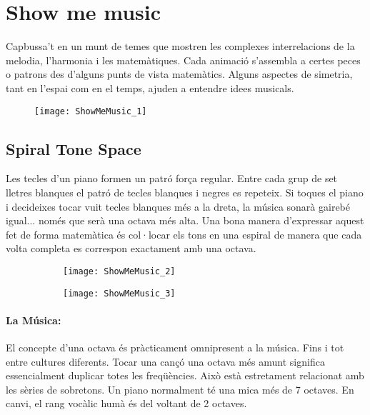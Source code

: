\section{Show me music}
Capbussa't en un munt de temes que mostren les complexes interrelacions de la melodia, l'harmonia i les matemàtiques. Cada animació s'assembla a certes peces o patrons des d'alguns punts de vista matemàtics. Alguns aspectes de simetria, tant en l'espai com en el temps, ajuden a entendre idees musicals.

\begin{figure}[!h]
\centering
\texttt{[image: ShowMeMusic\_1]}
\end{figure}

\subsection{Spiral Tone Space}
Les tecles d'un piano formen un patró força regular. Entre cada grup de set lletres blanques el patró de tecles blanques i negres es repeteix. Si toques el piano i decideixes tocar vuit tecles blanques més a la dreta, la música sonarà gairebé igual... només que serà una octava més alta. Una bona manera d'expressar aquest fet de forma matemàtica és col·locar els tons en una espiral de manera que cada volta completa es correspon exactament amb una octava. 

\begin{figure}[h]
\centering
\begin{subfigure}{0.45\textwidth}
\centering
\texttt{[image: ShowMeMusic\_2]}
\end{subfigure}
\begin{subfigure}{0.45\textwidth}
\centering
\texttt{[image: ShowMeMusic\_3]}
\end{subfigure}
\end{figure}


\paragraph{La Música:} El concepte d'una octava és pràcticament omnipresent a la música. Fins i tot entre cultures diferents. Tocar una cançó una octava més amunt significa essencialment duplicar totes les freqüències. Això està estretament relacionat amb les sèries de sobretons. Un piano normalment té una mica més de 7 octaves. En canvi, el rang vocàlic humà és del voltant de 2 octaves.  



